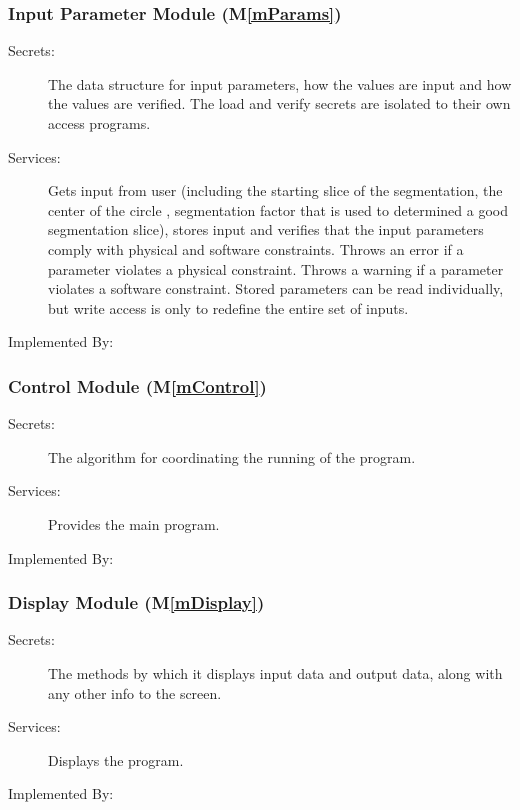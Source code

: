 \documentclass[12pt, titlepage]{article}
\newcommand{\mref}[1]{M\ref{#1}}
\begin{document}
\subsubsection{Input Parameter Module (\mref{mParams})}

\begin{description}
\item[Secrets:] The data structure for input parameters, how the
values are input and how the values are verified.  The load and verify secrets
are isolated to their own access programs.
\item[Services:] Gets input from user (including the starting slice of the segmentation, the center of the circle
, segmentation factor that is used to determined a good segmentation slice), stores input and verifies that the
  input parameters comply with physical and software constraints. Throws an
  error if a parameter violates a physical constraint. Throws a warning if a
  parameter violates a software constraint.  Stored parameters can be read
  individually, but write access is only to redefine the entire set of inputs.
\item[Implemented By:] \progname{}
\end{description}

\subsubsection{Control Module (\mref{mControl})}

\begin{description}
\item[Secrets:]The algorithm for coordinating the running of the program.
\item[Services:]Provides the main program.
\item[Implemented By:] \progname
\end{description}

\subsubsection{Display Module (\mref{mDisplay})}
\begin{description}
\item[Secrets:]The methods by which it displays input data and output data, along 
with any other info to the screen.
\item[Services:]Displays the program.
\item[Implemented By:] \progname
\end{description}
\end{document}
